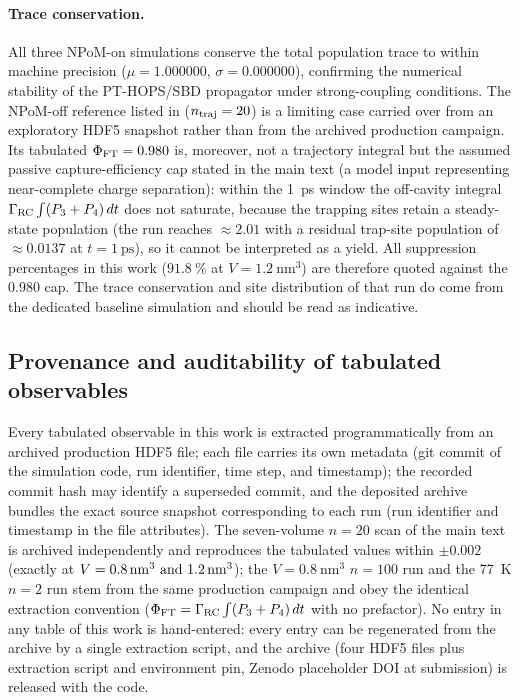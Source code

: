 \documentclass[11pt,a4paper]{article}
\begin{document}
\paragraph{Trace conservation.} All three NPoM-on simulations conserve the total population trace to within machine precision ($\mu =\num{1.000000}$, $\sigma =\num{0.000000}$), confirming the numerical stability of the PT-HOPS/SBD propagator under strong-coupling conditions. The NPoM-off reference listed in  ($n_{\rm traj} = 20$) is a limiting case carried over from an exploratory HDF5 snapshot rather than from the archived production campaign. Its tabulated $\Phi_{\rm FT} =\num{0.980}$ is, moreover, not a trajectory integral but the assumed passive capture-efficiency cap stated in the main text (a model input representing near-complete charge separation): within the \qty{1}{\ps} window the off-cavity integral $\Gamma_{\rm RC}\int (P_3+P_4)\,dt$ does not saturate, because the trapping sites retain a steady-state population (the run reaches $\approx 2.01$ with a residual trap-site population of $\approx\num{0.0137}$ at $t = \qty{1}{\ps}$), so it cannot be interpreted as a yield. All suppression percentages in this work ($\qty{91.8}{\percent}$ at $V = \qty{1.2}{\nm\cubed}$) are therefore quoted against the \num{0.980} cap. The trace conservation and site distribution of that run do come from the dedicated baseline simulation and should be read as indicative.

\subsection{Provenance and auditability of tabulated observables}

Every tabulated observable in this work is extracted programmatically from an archived production HDF5 file; each file carries its own metadata (git commit of the simulation code, run identifier, time step, and timestamp); the recorded commit hash may identify a superseded commit, and the deposited archive bundles the exact source snapshot corresponding to each run (run identifier and timestamp in the file attributes). The seven-volume $n=20$ scan of the main text is archived independently and reproduces the tabulated values within $\pm 0.002$ (exactly at $V = \qtylist{0.8;1.2}{\nm\cubed}$); the $V = \qty{0.8}{\nm\cubed}$ $n=100$ run and the \qty{77}{\kelvin} $n=2$ run stem from the same production campaign and obey the identical extraction convention ($\Phi_{\rm FT} = \Gamma_{\rm RC} \int (P_3 + P_4)\,dt$ with no prefactor). No entry in any table of this work is hand-entered: every entry can be regenerated from the archive by a single extraction script, and the archive (four HDF5 files plus extraction script and environment pin, Zenodo placeholder DOI at submission) is released with the code.
\end{document}
